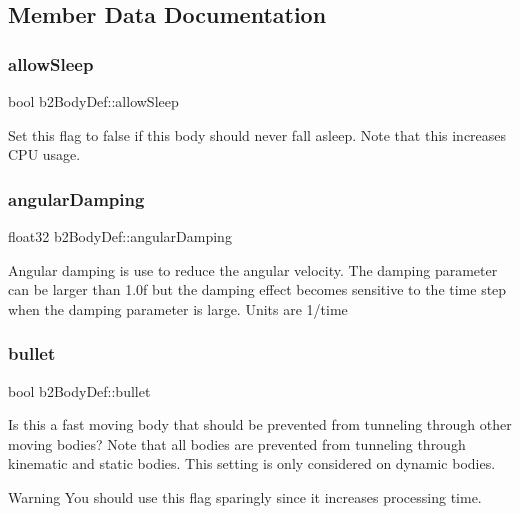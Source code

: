\subsection{Member Data Documentation}
\mbox{\label{structb2BodyDef_a0765068172e521ed63cb34084c59c003}} 
\subsubsection{\texorpdfstring{allow\+Sleep}{allowSleep}}
{\footnotesize\ttfamily bool b2\+Body\+Def\+::allow\+Sleep}

Set this flag to false if this body should never fall asleep. Note that this increases C\+PU usage. \mbox{\label{structb2BodyDef_a01b8dc8ad9f0962efef9e4a8e836feb6}} 
\subsubsection{\texorpdfstring{angular\+Damping}{angularDamping}}
{\footnotesize\ttfamily float32 b2\+Body\+Def\+::angular\+Damping}

Angular damping is use to reduce the angular velocity. The damping parameter can be larger than 1.\+0f but the damping effect becomes sensitive to the time step when the damping parameter is large. Units are 1/time \mbox{\label{structb2BodyDef_a7c0047c9a98a1d20614eeddcdbce7586}} 
\subsubsection{\texorpdfstring{bullet}{bullet}}
{\footnotesize\ttfamily bool b2\+Body\+Def\+::bullet}

Is this a fast moving body that should be prevented from tunneling through other moving bodies? Note that all bodies are prevented from tunneling through kinematic and static bodies. This setting is only considered on dynamic bodies. \begin{DoxyWarning}{Warning}
You should use this flag sparingly since it increases processing time. 
\end{DoxyWarning}
\mbox{\label{structb2BodyDef_a728f6df3be7dedb331455105e3659d46}} 
